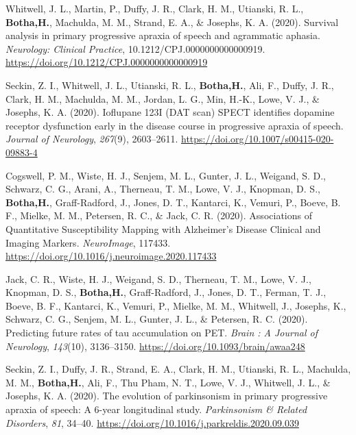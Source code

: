 \documentclass[11pt, a4paper]{awesome-cv}
\begin{document}
\leavevmode\hypertarget{ref-whitwell_survival_2020}{}%
Whitwell, J. L., Martin, P., Duffy, J. R., Clark, H. M., Utianski, R.
L., \textbf{Botha,H.}, Machulda, M. M., Strand, E. A., \& Josephs, K. A.
(2020). Survival analysis in primary progressive apraxia of speech and
agrammatic aphasia. \emph{Neurology: Clinical Practice},
10.1212/CPJ.0000000000000919.
\url{https://doi.org/10.1212/CPJ.0000000000000919}

\leavevmode\hypertarget{ref-seckin_ioflupane_2020}{}%
Seckin, Z. I., Whitwell, J. L., Utianski, R. L., \textbf{Botha,H.}, Ali,
F., Duffy, J. R., Clark, H. M., Machulda, M. M., Jordan, L. G., Min,
H.-K., Lowe, V. J., \& Josephs, K. A. (2020). Ioflupane {123I} ({DAT}
scan) {SPECT} identifies dopamine receptor dysfunction early in the
disease course in progressive apraxia of speech. \emph{Journal of
Neurology}, \emph{267}(9), 2603--2611.
\url{https://doi.org/10.1007/s00415-020-09883-4}

\leavevmode\hypertarget{ref-cogswell_associations_2020}{}%
Cogswell, P. M., Wiste, H. J., Senjem, M. L., Gunter, J. L., Weigand, S.
D., Schwarz, C. G., Arani, A., Therneau, T. M., Lowe, V. J., Knopman, D.
S., \textbf{Botha,H.}, Graff-Radford, J., Jones, D. T., Kantarci, K.,
Vemuri, P., Boeve, B. F., Mielke, M. M., Petersen, R. C., \& Jack, C. R.
(2020). Associations of {Quantitative} {Susceptibility} {Mapping} with
{Alzheimer}'s {Disease} {Clinical} and {Imaging} {Markers}.
\emph{NeuroImage}, 117433.
\url{https://doi.org/10.1016/j.neuroimage.2020.117433}

\leavevmode\hypertarget{ref-jack_predicting_2020}{}%
Jack, C. R., Wiste, H. J., Weigand, S. D., Therneau, T. M., Lowe, V. J.,
Knopman, D. S., \textbf{Botha,H.}, Graff-Radford, J., Jones, D. T.,
Ferman, T. J., Boeve, B. F., Kantarci, K., Vemuri, P., Mielke, M. M.,
Whitwell, J., Josephs, K., Schwarz, C. G., Senjem, M. L., Gunter, J. L.,
\& Petersen, R. C. (2020). Predicting future rates of tau accumulation
on {PET}. \emph{Brain : A Journal of Neurology}, \emph{143}(10),
3136--3150. \url{https://doi.org/10.1093/brain/awaa248}

\leavevmode\hypertarget{ref-seckin_evolution_2020}{}%
Seckin, Z. I., Duffy, J. R., Strand, E. A., Clark, H. M., Utianski, R.
L., Machulda, M. M., \textbf{Botha,H.}, Ali, F., Thu Pham, N. T., Lowe,
V. J., Whitwell, J. L., \& Josephs, K. A. (2020). The evolution of
parkinsonism in primary progressive apraxia of speech: {A} 6-year
longitudinal study. \emph{Parkinsonism \& Related Disorders}, \emph{81},
34--40. \url{https://doi.org/10.1016/j.parkreldis.2020.09.039}
\end{document}
